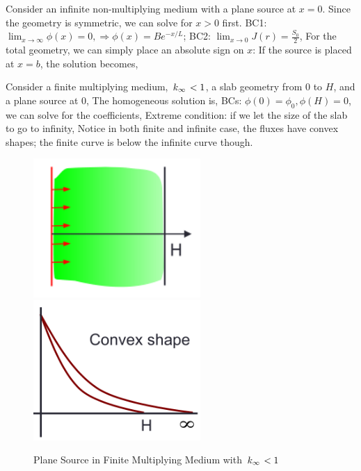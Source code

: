 \documentclass{school-22.211-notes}
\begin{document}
\clearpage
{}
Consider an infinite non-multiplying medium with a plane source at $x=0$. Since the geometry is symmetric, we can solve for $x>0$ first. 
BC1: $\lim_{x \to \infty} \phi(x) = 0, \Rightarrow \phi(x) = B e^{-x/L}$; BC2: $\lim_{x\to 0} J(r)  = \frac{S_0}{2}$, 
For the total geometry, we can simply place an absolute sign on $x$:
If the source is placed at $x=b$, the solution becomes,


\clearpage
{}
Consider a finite multiplying medium, $\left. k_{\infty} \right. < 1$, a slab geometry from $0$ to $H$, and a plane source at $0$, 
The homogeneous solution is, 
BCs: $\phi(0) = \phi_0, \phi(H) = 0$, we can solve for the coefficients, 
Extreme condition: if we let the size of the slab to go to infinity, 
Notice in both finite and infinite case, the fluxes have convex shapes; the finite curve is below the infinite curve though. 
\begin{figure}[ht]
  \centering
  \includegraphics[width=2.5in]{images/dfs/plane-multiplying-geo.png}
  \includegraphics[width=2.5in]{images/dfs/plane-multiplying-phi.png}
  \caption{Plane Source in Finite Multiplying Medium with $\left. k_{\infty} \right. < 1$}
\end{figure}
\end{document}
